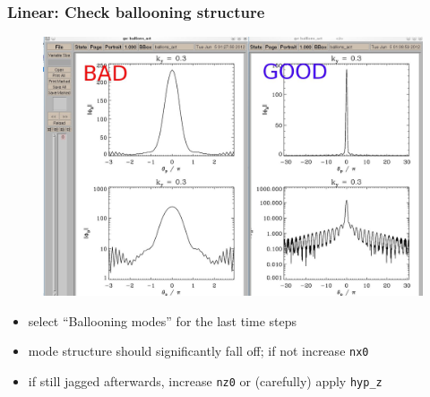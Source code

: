 \documentclass[10pt]{beamer}
\begin{document}
\begin{frame}
  \frametitle{Linear: Check ballooning structure}

\begin{figure}
\includegraphics[height=0.6\textheight]{figs/ballooning.jpg}
\end{figure}

\begin{block}{}
\begin{itemize}
 \item select ``Ballooning modes'' for the last time steps
 \item mode structure should significantly fall off; if not increase {\tt nx0}
 \item if still jagged afterwards, increase {\tt nz0} or (carefully) apply {\tt hyp\_z}
\end{itemize}

\end{block}

\end{frame}

\end{document}
